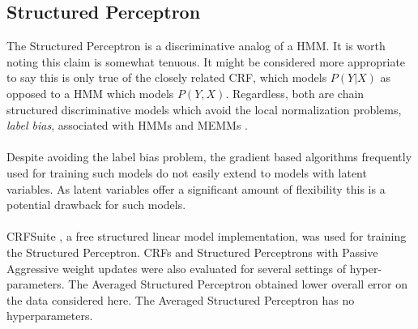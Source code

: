\documentclass[12pt]{report}
\newcommand{\1}[0]{\mathbbm{1}}
\begin{document}
\subsection{Structured Perceptron}
The Structured Perceptron is a discriminative analog of a \ac{HMM}.
It is worth noting this claim is somewhat tenuous. It might
be considered more appropriate to say this is only true of the closely
related \ac{CRF}, which models $P(Y|X)$ as opposed to a \ac{HMM}
which models $P(Y,X)$. Regardless, both are chain structured discriminative
models which avoid the local normalization problems, \emph{label bias}, associated
with \acp{HMM} and \acp{MEMM} \cite{lafferty-crf}.
\\\\
Despite avoiding the label bias problem, the gradient based algorithms frequently
used for training such models do not easily extend to models with latent variables.
As latent variables offer a significant amount of flexibility this is a potential
drawback for such models.
\\\\
CRFSuite \cite{CRFsuite}, a free structured linear model implementation, was used
for training the Structured Perceptron. \acp{CRF} and Structured Perceptrons
with Passive Aggressive weight updates were also evaluated for several settings of
hyper-parameters. The Averaged Structured Perceptron obtained lower overall
error on the data considered here. The Averaged Structured Perceptron has no hyperparameters.
\end{document}
